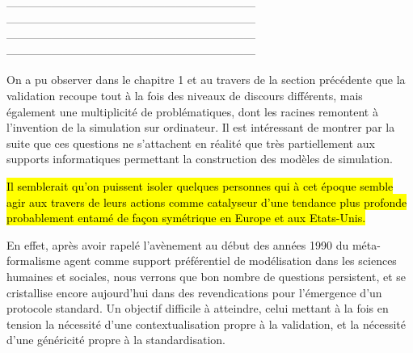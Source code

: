 

------------------------------------------------------------------
------------------------------------------------------------------
------------------------------------------------------------------
------------------------------------------------------------------


On a pu observer dans le chapitre 1 et au travers de la section précédente que la validation recoupe tout à la fois des niveaux de discours différents, mais également une multiplicité de problématiques, dont les racines remontent à l'invention de la simulation sur ordinateur. Il est intéressant de montrer par la suite que ces questions ne s'attachent en réalité que très partiellement aux supports informatiques permettant la construction des modèles de simulation. 

\hl{Il semblerait qu'on puissent isoler quelques personnes qui à cet époque semble agir aux travers de leurs actions comme catalyseur d'une tendance plus profonde probablement entamé de façon symétrique en Europe et aux Etats-Unis.}

En effet, après avoir rapelé l’avènement au début des années 1990 du méta-formalisme agent comme support préférentiel de modélisation dans les sciences humaines et sociales, nous verrons que bon nombre de questions persistent, et se cristallise encore aujourd'hui dans des revendications pour l'émergence d'un protocole standard. Un objectif difficile à atteindre, celui mettant à la fois en tension la nécessité d'une contextualisation propre à la validation, et la nécessité d'une généricité propre à la standardisation.


